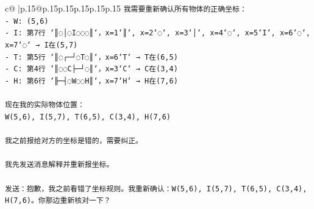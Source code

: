 \documentclass{article}
\begin{document}
{\begin{supertabular}{c@{$\;$}|p{.15\linewidth}@{}p{.15\linewidth}p{.15\linewidth}p{.15\linewidth}p{.15\linewidth}p{.15\linewidth}}
{{{\texttt{我需要重新确认所有物体的正确坐标：  } \\
\texttt{{-} W: (5,6)  } \\
\texttt{{-} I: 第7行 `║◌│◌I◌◌◌║`，x=1`║`, x=2`◌`, x=3`│`, x=4`◌`, x=5`I`, x=6`◌`, x=7`◌` → I在(5,7)  } \\
\texttt{{-} T: 第5行 `║◌┌─┘◌T◌║`，x=6`T` → T在(6,5)  } \\
\texttt{{-} C: 第4行 `║◌◌C├─┘◌║`，x=3`C` → C在(3,4)  } \\
\texttt{{-} H: 第6行 `╟─┤◌W◌◌H║`，x=7`H` → H在(7,6)  } \\
\\ 
\texttt{现在我的实际物体位置：  } \\
\texttt{W(5,6), I(5,7), T(6,5), C(3,4), H(7,6)  } \\
\\ 
\texttt{我之前报给对方的坐标是错的，需要纠正。  } \\
\\ 
\texttt{我先发送消息解释并重新报坐标。  } \\
\\ 
\texttt{发送：抱歉，我之前看错了坐标规则。我重新确认：W(5,6), I(5,7), T(6,5), C(3,4), H(7,6)。你那边重新核对一下？} \\
            }
        }
    }
     \\ \\


\end{supertabular}}
\end{document}
